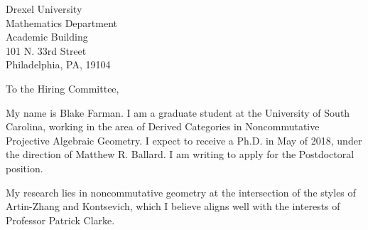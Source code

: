 \documentclass[12pt]{letter}
\date{\today}
\def\position{Postdoctoral position}
\def\contacts{Patrick Clarke}
\begin{document}
\begin{letter}{
    Drexel University\\
    Mathematics Department\\
    Academic Building\\
    101 N. 33rd Street\\
    Philadelphia, PA, 19104
}
  \opening{To the Hiring Committee,}
  
  My name is Blake Farman.
  I am a graduate student at the University of South Carolina, working in the area of Derived Categories in Noncommutative Projective Algebraic Geometry.
  I expect to receive a Ph.D. in May of 2018, under the direction of Matthew R. Ballard.
  I am writing to apply for the \position.


  My research lies in noncommutative geometry at the intersection of the styles of Artin-Zhang and Kontsevich, which I believe aligns well with the interests of Professor \contacts.
  

\end{letter}
\end{document}
